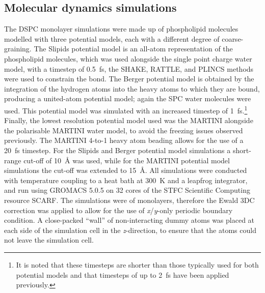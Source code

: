 \subsection{Molecular dynamics simulations}
The DSPC monolayer simulations were made up of phospholipid molecules modelled with three potential models, each with a different degree of coarse-graining.
The Slipids potential model is an all-atom representation of the phospholipid molecules,\autocite{jambeck_derivation_2012} which was used alongside the single point charge water model, with a timestep of \SI{0.5}{\femto\second}, the SHAKE, RATTLE, and PLINCS methods were used to constrain the  bond.\autocite{miyamoto_settle_1992,hess_p-lincs_2008}
The Berger potential model is obtained by the integration of the hydrogen atoms into the heavy atoms to which they are bound, producing a united-atom potential model;\autocite{berger_molecular_1997} again the SPC water molecules were used.
This potential model was simulated with an increased timestep of \SI{1}{\femto\second}.\footnote{It is noted that these timesteps are shorter than those typically used for both potential models and that timesteps of up to \SI{2}{\femto\second} have been applied previously.}
Finally, the lowest resolution potential model used was the MARTINI\autocite{marrink_martini_2007} alongside the polarisable MARTINI water model,\autocite{yesylevskyy_polarizable_2010} to avoid the freezing issues observed previously.\autocite{koutsioubas_combined_2016}
The MARTINI 4-to-1 heavy atom beading allows for the use of a \SI{20}{\femto\second} timestep.
For the Slipids and Berger potential model simulations a short-range cut-off of \SI{10}{\angstrom} was used, while for the MARTINI potential model simulations the cut-off was extended to \SI{15}{\angstrom}.
All simulations were conducted with temperature coupling to a heat bath at \SI{300}{\kelvin} and a leapfrog integrator, and run using GROMACS 5.0.5\autocite{berendsen_gromacs_1995,lindahl_gromacs_2001,van_der_spoel_gromacs_2005,hess_gromacs_2008} on \num{32} cores of the STFC Scientific Computing resource SCARF.
The simulations were of monolayers, therefore the Ewald 3DC correction was applied to allow for the use of \emph{x}/\emph{y}-only periodic boundary condition.\autocite{yeh_ewald_1999}
A close-packed ``wall'' of non-interacting dummy atoms was placed at each side of the simulation cell in the \emph{z}-direction, to ensure that the atoms could not leave the simulation cell.

